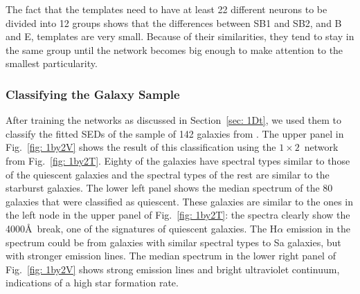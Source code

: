             The fact that the templates need to have at least 22 different neurons to be divided into 12 groups shows that the differences between SB1 and SB2, and B and E, templates are very small.
            Because of their similarities, they tend to stay in the same group until the network becomes big enough to make attention to the smallest particularity.
           
        \subsubsection{Classifying the Galaxy Sample}
         \label{sec: 1Dv}
            After training the networks as discussed in Section~\ref{sec: 1Dt}, we used them to classify the fitted SEDs of the sample of 142 galaxies from .
            The upper panel in Fig.~\ref{fig: 1by2V} shows the result of this classification using the $1\times2$~network from Fig.~\ref{fig: 1by2T}.
            Eighty of the galaxies have spectral types similar to those of the quiescent galaxies and the spectral types of the rest are similar to the starburst galaxies.
            The lower left panel shows the median spectrum of the 80 galaxies that were classified as quiescent. 
            These galaxies are similar to the ones in the left node in the upper panel of Fig.~\ref{fig: 1by2T}:
            the spectra clearly show the 4000\AA~break, one of the signatures of quiescent galaxies.
            The H$\alpha$ emission in the spectrum could be from galaxies with similar spectral types to Sa galaxies, but with stronger emission lines.
            The median spectrum in the lower right panel of Fig.~\ref{fig: 1by2V} shows strong emission lines and bright ultraviolet continuum, indications of a high star formation rate.
